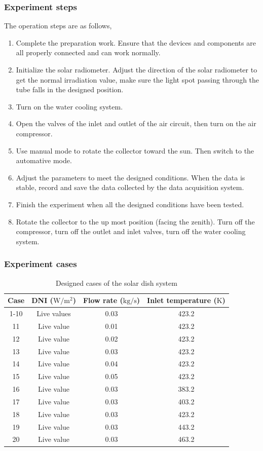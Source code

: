 \subsubsection{Experiment steps}
 The operation steps are as follows,
\begin{enumerate}[label=(\arabic*)]
	\item Complete the preparation work. Ensure that the devices and components are all properly connected and can work normally.
	\item Initialize the solar radiometer. Adjust the direction of the solar radiometer to get the normal irradiation value, make sure the light spot passing through the tube falls in the designed position.
	\item Turn on the water cooling system.
	\item Open the valves of the inlet and outlet of the air circuit, then turn on the air compressor.
	\item Use manual mode to rotate the collector toward the sun. Then switch to the automative mode.
	\item Adjust the parameters to meet the designed conditions. When the data is stable, record and save the data collected by the data acquisition system.
	\item Finish the experiment when all the designed conditions have been tested. 
	\item Rotate the collector to the up most position (facing the zenith). Turn off the compressor, turn off the outlet and inlet valves, turn off the water cooling system.
\end{enumerate}

\subsubsection{Experiment cases}

\begin{table}[htbp]
	\caption{Designed cases of the solar dish system}
	\centering
	\begin{tabular}{cccc}
		\toprule
		Case	& DNI ($\mathrm{W/m^2}$)	&	Flow rate ($\mathrm{kg/s}$)			&	Inlet temperature ($\mathrm{K}$)\\
		\midrule
		1-10	&	Live values	&	0.03	&	423.2\\
		11	&	Live value	&	0.01	&	423.2\\
		12	&	Live value	&	0.02	&	423.2\\
		13	&	Live value	&	0.03	&	423.2\\
		14	&	Live value	&	0.04	&	423.2\\
		15	&	Live value	&	0.05	&	423.2\\
		16	&	Live value	&	0.03	&	383.2\\
		17	&	Live value	&	0.03	&	403.2\\
		18	&	Live value	&	0.03	&	423.2\\
		19	&	Live value	&	0.03	&	443.2\\
		20	&	Live value	&	0.03	&	463.2\\
		\bottomrule
	\end{tabular}
	
	\label{tab:DesignedCasesForDish}
\end{table}

